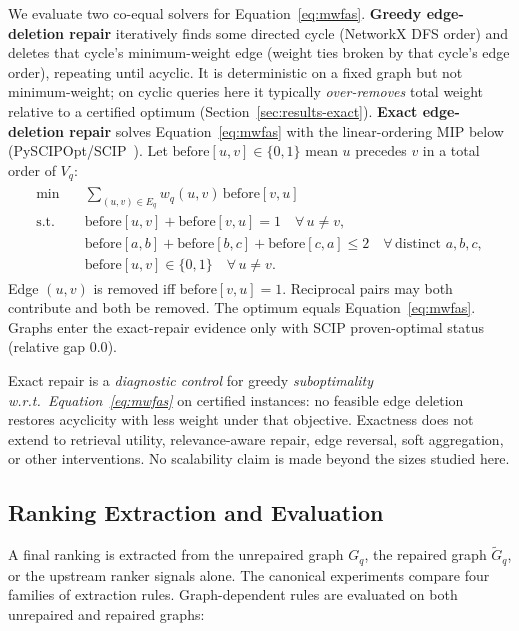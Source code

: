 \documentclass[pdflatex,sn-basic,Numbered]{sn-jnl}
\begin{document}
We evaluate two co-equal solvers for Equation~\eqref{eq:mwfas}.
\textbf{Greedy edge-deletion repair} iteratively finds some directed cycle
(NetworkX DFS order) and deletes that cycle's minimum-weight edge (weight
ties broken by that cycle's edge order), repeating until acyclic. It is
deterministic on a fixed graph but not minimum-weight; on cyclic queries
here it typically \emph{over-removes} total weight relative to a certified
optimum (Section~\ref{sec:results-exact}).
\textbf{Exact edge-deletion repair} solves Equation~\eqref{eq:mwfas} with
the linear-ordering MIP below
(PySCIPOpt/SCIP~\cite{groetschel1984cutting,baharev2021exact}). Let
$\mathrm{before}[u,v]\in\{0,1\}$ mean $u$ precedes $v$ in a total order of
$V_q$:
\begin{align}
\begin{split}
\min\quad
&\sum_{(u,v)\in E_q} w_q(u,v)\,\mathrm{before}[v,u] \\
\text{s.t.}\quad
&\mathrm{before}[u,v]+\mathrm{before}[v,u]=1
  \quad\forall\, u\neq v, \\
&\mathrm{before}[a,b]+\mathrm{before}[b,c]+\mathrm{before}[c,a]\le 2
  \quad\forall\, \text{distinct }a,b,c, \\
&\mathrm{before}[u,v]\in\{0,1\}
  \quad\forall\, u\neq v.
\end{split}
\label{eq:mwfas-mip}
\end{align}
Edge $(u,v)$ is removed iff $\mathrm{before}[v,u]=1$. Reciprocal pairs may
both contribute and both be removed. The optimum equals
Equation~\eqref{eq:mwfas}. Graphs enter the exact-repair evidence only with
SCIP proven-optimal status (relative gap $0.0$).

Exact repair is a \emph{diagnostic control} for greedy
\emph{suboptimality w.r.t.\ Equation~\eqref{eq:mwfas}} on certified
instances: no feasible edge deletion restores acyclicity with less weight
under that objective. Exactness does not extend to retrieval utility,
relevance-aware repair, edge reversal, soft aggregation, or other
interventions. No scalability claim is made beyond the sizes studied here.

\subsection{Ranking Extraction and Evaluation}
\label{sec:extraction-eval}

A final ranking is extracted from the unrepaired graph $G_q$, the repaired
graph $\widetilde{G}_q$, or the upstream ranker signals alone. The canonical
experiments compare four families of extraction rules. Graph-dependent rules
are evaluated on both unrepaired and repaired graphs:
\end{document}

